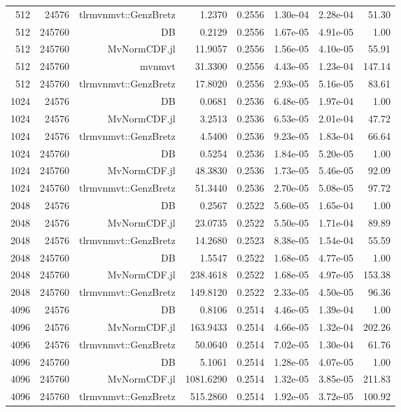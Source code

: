 \begin{tabular}{|r|r|r|r|r|r|r|r|}
  512 & 24576 & tlrmvnmvt::GenzBretz & 1.2370 & 0.2556 & 1.30e-04 & 2.28e-04 & 51.30 \\
  512 & 245760 & DB & 0.2129 & 0.2556 & 1.67e-05 & 4.91e-05 & 1.00 \\
  512 & 245760 & MvNormCDF.jl & 11.9057 & 0.2556 & 1.56e-05 & 4.10e-05 & 55.91 \\
  512 & 245760 & mvnmvt & 31.3300 & 0.2556 & 4.43e-05 & 1.23e-04 & 147.14 \\
  512 & 245760 & tlrmvnmvt::GenzBretz & 17.8020 & 0.2556 & 2.93e-05 & 5.16e-05 & 83.61 \\
  1024 & 24576 & DB & 0.0681 & 0.2536 & 6.48e-05 & 1.97e-04 & 1.00 \\
  1024 & 24576 & MvNormCDF.jl & 3.2513 & 0.2536 & 6.53e-05 & 2.01e-04 & 47.72 \\
  1024 & 24576 & tlrmvnmvt::GenzBretz & 4.5400 & 0.2536 & 9.23e-05 & 1.83e-04 & 66.64 \\
  1024 & 245760 & DB & 0.5254 & 0.2536 & 1.84e-05 & 5.20e-05 & 1.00 \\
  1024 & 245760 & MvNormCDF.jl & 48.3830 & 0.2536 & 1.73e-05 & 5.46e-05 & 92.09 \\
  1024 & 245760 & tlrmvnmvt::GenzBretz & 51.3440 & 0.2536 & 2.70e-05 & 5.08e-05 & 97.72 \\
  2048 & 24576 & DB & 0.2567 & 0.2522 & 5.60e-05 & 1.65e-04 & 1.00 \\
  2048 & 24576 & MvNormCDF.jl & 23.0735 & 0.2522 & 5.50e-05 & 1.71e-04 & 89.89 \\
  2048 & 24576 & tlrmvnmvt::GenzBretz & 14.2680 & 0.2523 & 8.38e-05 & 1.54e-04 & 55.59 \\
  2048 & 245760 & DB & 1.5547 & 0.2522 & 1.68e-05 & 4.77e-05 & 1.00 \\
  2048 & 245760 & MvNormCDF.jl & 238.4618 & 0.2522 & 1.68e-05 & 4.97e-05 & 153.38 \\
  2048 & 245760 & tlrmvnmvt::GenzBretz & 149.8120 & 0.2522 & 2.33e-05 & 4.50e-05 & 96.36 \\
  4096 & 24576 & DB & 0.8106 & 0.2514 & 4.46e-05 & 1.39e-04 & 1.00 \\
  4096 & 24576 & MvNormCDF.jl & 163.9433 & 0.2514 & 4.66e-05 & 1.32e-04 & 202.26 \\
  4096 & 24576 & tlrmvnmvt::GenzBretz & 50.0640 & 0.2514 & 7.02e-05 & 1.30e-04 & 61.76 \\
  4096 & 245760 & DB & 5.1061 & 0.2514 & 1.28e-05 & 4.07e-05 & 1.00 \\
  4096 & 245760 & MvNormCDF.jl & 1081.6290 & 0.2514 & 1.32e-05 & 3.85e-05 & 211.83 \\
  4096 & 245760 & tlrmvnmvt::GenzBretz & 515.2860 & 0.2514 & 1.92e-05 & 3.72e-05 & 100.92 \\
  \hline
\end{tabular}
